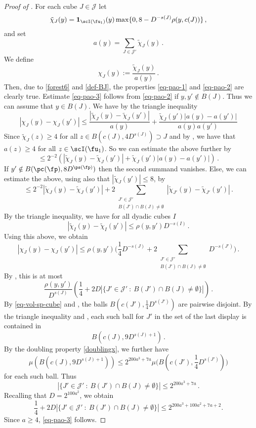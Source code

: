     \begin{proof}[Proof of ]
        \leanok
        For each cube $J \in \mathcal{J}$ let
        $$
            \tilde\chi_J(y) = \mathbf{1}_{\scI(\fu_1)}(y)\max\{0, 8 - D^{-s(J)} \rho(y, c(J))\}\,,
        $$
        and set
        $$
            a(y) = \sum_{J \in \mathcal{J}'} \tilde \chi_J(y)\,.
        $$
        We define
        \[
            \chi_J(y) := \frac{\tilde \chi_J(y)}{a(y)}\,.
        \]
        Then, due to \eqref{forest6} and \eqref{def-BJ}, the properties \eqref{eq-pao-1} and \eqref{eq-pao-2} are clearly true. Estimate \eqref{eq-pao-3} follows from \eqref{eq-pao-2} if $y, y' \notin B(J)$. Thus we can assume that $y \in B(J)$. We have by the triangle inequality
        $$
            |\chi_J(y) - \chi_J(y')| \le \frac{|\tilde \chi_J(y) - \tilde \chi_J(y')|}{a(y)} + \frac{\tilde \chi_J(y')|a(y) - a(y')|}{a(y)a(y')}
        $$
        Since $\tilde \chi_J(z) \ge 4$ for all $z \in B(c(J),4D^{s(J)}) \supset J$ and by , we have that $a(z) \ge 4$ for all $z \in \scI(\fu_1)$. So we can estimate the above further by
        $$
            \le 2^{-2}(|\tilde \chi_J(y) - \tilde \chi_J(y')| + \tilde \chi_J(y')|a(y) - a(y')|)\,.
        $$
        If $y' \notin B(\pc(\fp), 8D^{\ps(\fp)})$ then the second summand vanishes. Else, we can estimate the above, using also that $|\tilde \chi_J(y')| \le 8$, by
        $$
            \le 2^{-2} |\tilde \chi_J(y) - \tilde \chi_J(y')| + 2 \sum_{\substack{J' \in \mathcal{J}'\\ B(J') \cap B(J) \ne \emptyset}}|\tilde \chi_{J'}(y) - \tilde \chi_{J'} (y')|\,.
        $$
        By the triangle inequality, we have for all dyadic cubes $I$
        $$
            |\tilde \chi_I(y) - \tilde \chi_I(y')| \le \rho(y, y') D^{-s(I)}\,.
        $$
        Using this above, we obtain
        $$
            |\chi_J(y) - \chi_J(y')| \le \rho(y,y') \Big( \frac{1}{4} D^{-s(J)} + 2 \sum_{\substack{J' \in \mathcal{J}'\\ B(J') \cap B(J) \ne \emptyset}} D^{-s(J')}\Big)\,.
        $$
        By , this is at most
        $$
             \frac{\rho(y,y')}{D^{s(J)}} \left( \frac{1}{4} + 2D |\{J' \in \mathcal{J}' \ : \ B(J') \cap B(J) \ne \emptyset\}|\right)\,.
        $$
        By \eqref{eq-vol-sp-cube} and , the balls $B(c(J'), \frac{1}{4} D^{s(J')})$ are pairwise disjoint. By the triangle inequality and , each such ball for $J'$ in the set of the last display is contained in
        $$
            B(c(J), 9 D^{s(J) + 1})\,.
        $$
        By the doubling property \eqref{doublingx}, we further have
        $$
            \mu(B(c(J), 9 D^{s(J) + 1})) \le 2^{200a^3 + 7a} \mu\Big(B(c(J'), \frac{1}{4}D^{s(J')})\Big)
        $$
        for each such ball.
        Thus
        $$
            |\{J' \in \mathcal{J}' \ : \ B(J') \cap B(J) \ne \emptyset\}| \le 2^{200a^3 + 7a}\,.
        $$
        Recalling that $D=2^{100a^2}$, we obtain
        $$\frac{1}{4} + 2D |\{J' \in \mathcal{J}' \ : \ B(J') \cap B(J) \ne \emptyset\}|\leq 2^{200a^3 + 100a^2 + 7a + 2}.$$
        Since $a\ge 4$, \eqref{eq-pao-3} follows.
    \end{proof}

